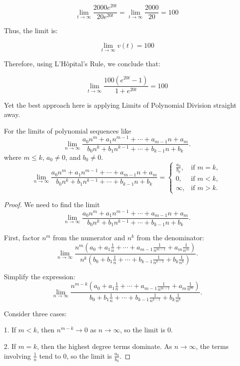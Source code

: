 \documentclass[12pt,a4paper]{article}
\begin{document}
\[
\lim_{t \to \infty} \frac{2000e^{20t}}{20e^{20t}} = \lim_{t \to \infty} \frac{2000}{20} = 100
\]

Thus, the limit is:

\[
\lim_{t \to \infty} v(t) = 100
\]

Therefore, using L'Hôpital's Rule, we conclude that:

\[
\lim_{t \to \infty} \frac{100\left( e^{20t} - 1 \right)}{1 + e^{20t}} = 100
\]

\begin{remark}
Yet the best approach here is applying Limits of Polynomial Division straight away.
\begin{corollary}
For the limits of polynomial sequences like
\[
\lim_{n \to \infty} \frac{a_0 n^m + a_1 n^{m-1} + \cdots + a_{m-1} n + a_m}{b_0 n^k + b_1 n^{k-1} + \cdots + b_{k-1} n + b_k}.
\]
where \(m \leq k\), \(a_0 \neq 0\), and \(b_0 \neq 0\).
\[
\lim_{n \to \infty} \frac{a_0 n^m + a_1 n^{m-1} + \cdots + a_{m-1} n + a_m}{b_0 n^k + b_1 n^{k-1} + \cdots + b_{k-1} n + b_k} = 
\begin{cases} 
\frac{a_0}{b_0}, & \text{if } m = k, \\
0, & \text{if } m < k, \\
\infty, & \text{if } m > k.
\end{cases}
\]
\end{corollary}
\begin{proof}
We need to find the limit
\[
\lim_{n \to \infty} \frac{a_0 n^m + a_1 n^{m-1} + \cdots + a_{m-1} n + a_m}{b_0 n^k + b_1 n^{k-1} + \cdots + b_{k-1} n + b_k}.
\]

First, factor \(n^m\) from the numerator and \(n^k\) from the denominator:
\[
\lim_{n \to \infty} \frac{n^m \left(a_0 + a_1 \frac{1}{n} + \cdots + a_{m-1} \frac{1}{n^{m-1}} + a_m \frac{1}{n^m}\right)}{n^k \left(b_0 + b_1 \frac{1}{n} + \cdots + b_{k-1} \frac{1}{n^{k-1}} + b_k \frac{1}{n^k}\right)}.
\]

Simplify the expression:
\[
\lim_{n \to \infty} \frac{n^{m-k} \left(a_0 + a_1 \frac{1}{n} + \cdots + a_{m-1} \frac{1}{n^{m-1}} + a_m \frac{1}{n^m}\right)}{b_0 + b_1 \frac{1}{n} + \cdots + b_{k-1} \frac{1}{n^{k-1}} + b_k \frac{1}{n^k}}.
\]

Consider three cases:

1. If \(m < k\), then \(n^{m-k} \to 0\) as \(n \to \infty\), so the limit is \(0\).

2. If \(m = k\), then the highest degree terms dominate. As \(n \to \infty\), the terms involving \(\frac{1}{n}\) tend to \(0\), so the limit is \(\frac{a_0}{b_0}\).


\end{proof}
\end{remark}
\end{document}
